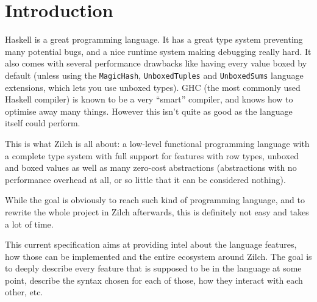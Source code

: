 \part{Introduction}\label{part:intro}

Haskell is a great programming language. It has a great type system preventing many potential bugs, and a nice runtime system making debugging really hard. It also comes with several performance drawbacks like having every value boxed by default (unless using the \texttt{MagicHash}, \texttt{UnboxedTuples} and \texttt{UnboxedSums} language extensions, which lets you use unboxed types). GHC (the most commonly used Haskell compiler) is known to be a very ``smart'' compiler, and knows how to optimise away many things. However this isn't quite as good as the language itself could perform.

This is what Zilch is all about: a low-level functional programming language with a complete type system with full support for features with row types, unboxed and boxed values as well as many zero-cost abstractions (abstractions with no performance overhead at all, or so little that it can be considered nothing).

While the goal is obviously to reach such kind of programming language, and to rewrite the whole project in Zilch afterwards, this is definitely not easy and takes a lot of time.

\vspace{\baselineskip}

This current specification aims at providing intel about the language features, how those can be implemented and the entire ecosystem around Zilch.
The goal is to deeply describe every feature that is supposed to be in the language at some point, describe the syntax chosen for each of those, how they interact with each other, etc.
